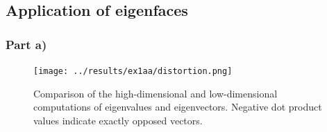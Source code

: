 \documentclass[10pt,technote]{IEEEtran}
\begin{document}
\subsection{Application of eigenfaces}
\subsubsection{Part a)}

\begin{figure}
    \centering
    \texttt{[image: ../results/ex1aa/distortion.png]}
    \caption{Comparison of the high-dimensional and low-dimensional computations of eigenvalues and eigenvectors. Negative dot product values indicate exactly opposed vectors.}
    \label{fig:eig_diff1}
\end{figure}


%
%
\end{document}
